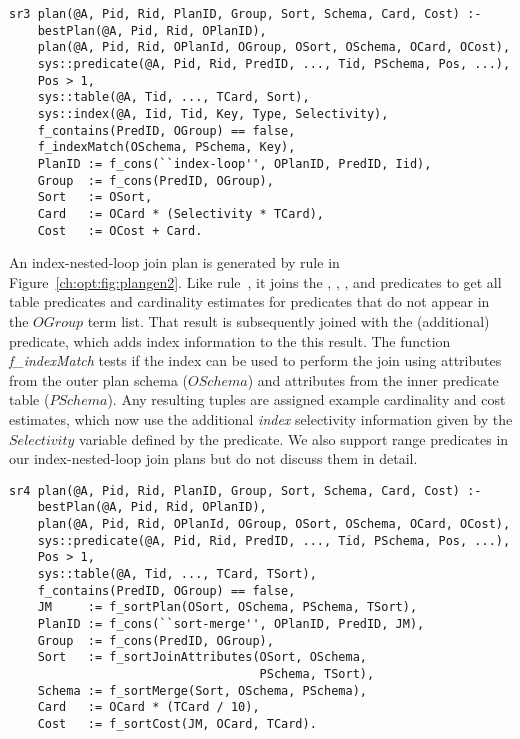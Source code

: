 \begin{figure*}
\ssp
\centering
\begin{lstlisting}
sr3 plan(@A, Pid, Rid, PlanID, Group, Sort, Schema, Card, Cost) :-
    bestPlan(@A, Pid, Rid, OPlanID),
    plan(@A, Pid, Rid, OPlanId, OGroup, OSort, OSchema, OCard, OCost),
    sys::predicate(@A, Pid, Rid, PredID, ..., Tid, PSchema, Pos, ...),
    Pos > 1,
    sys::table(@A, Tid, ..., TCard, Sort),
    sys::index(@A, Iid, Tid, Key, Type, Selectivity),
    f_contains(PredID, OGroup) == false,
    f_indexMatch(OSchema, PSchema, Key),
    PlanID := f_cons(``index-loop'', OPlanID, PredID, Iid),
    Group  := f_cons(PredID, OGroup),
    Sort   := OSort,
    Card   := OCard * (Selectivity * TCard),
    Cost   := OCost + Card.
\end{lstlisting}
\caption{\label{ch:opt:fig:plangen2}index-nested-loop join method.}
\end{figure*}

An index-nested-loop join plan is generated by rule  in
Figure~\ref{ch:opt:fig:plangen2}.  Like rule~, it joins the
, , , and  predicates
to get all table predicates and cardinality estimates for predicates that do
not appear in the $OGroup$ term list.  That result is subsequently joined with
the (additional)  predicate, which adds index information to the
this result.  The function {\em f\_indexMatch} tests if the index can be used
to perform the join using attributes from the outer plan schema ($OSchema$) and
attributes from the inner predicate table ($PSchema$).  Any resulting tuples
are assigned example cardinality and cost estimates, which now use the
additional {\em index} selectivity information given by the $Selectivity$
variable defined by the  predicate.  We also support range
predicates in our index-nested-loop join plans but do not discuss them in
detail.

\begin{figure*}
\ssp
\centering
\begin{lstlisting}
sr4 plan(@A, Pid, Rid, PlanID, Group, Sort, Schema, Card, Cost) :-
    bestPlan(@A, Pid, Rid, OPlanID),
    plan(@A, Pid, Rid, OPlanId, OGroup, OSort, OSchema, OCard, OCost),
    sys::predicate(@A, Pid, Rid, PredID, ..., Tid, PSchema, Pos, ...),
    Pos > 1,
    sys::table(@A, Tid, ..., TCard, TSort),
    f_contains(PredID, OGroup) == false,
    JM     := f_sortPlan(OSort, OSchema, PSchema, TSort),
    PlanID := f_cons(``sort-merge'', OPlanID, PredID, JM),
    Group  := f_cons(PredID, OGroup),
    Sort   := f_sortJoinAttributes(OSort, OSchema, 
                                   PSchema, TSort),
    Schema := f_sortMerge(Sort, OSchema, PSchema),
    Card   := OCard * (TCard / 10),
    Cost   := f_sortCost(JM, OCard, TCard).
\end{lstlisting}
\caption{\label{ch:opt:fig:plangen3}sort-merge join method.}
\end{figure*}

